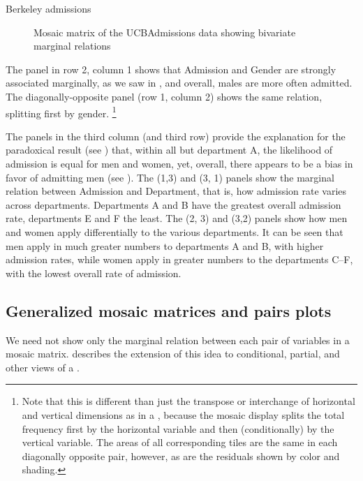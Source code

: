\documentclass[10pt,krantz2]{krantz}\usepackage[]{graphicx}\usepackage[]{color}
\newenvironment{knitrout}{}{} %
\renewenvironment{knitrout}{\small\renewcommand{\baselinestretch}{.85}}{} %
\begin{document}
\begin{Example}[berkeley4]{Berkeley admissions}
\begin{knitrout}
\begin{figure}[!htb]
\caption[Mosaic matrix of the UCBAdmissions data showing bivariate marginal relations]{Mosaic matrix of the UCBAdmissions data showing bivariate marginal relations\label{fig:berk-pairs1}}
\end{figure}


\end{knitrout}
The panel in row 2, column 1
shows that Admission and Gender are
strongly associated marginally, as we saw in ,
and overall, males are more often admitted.
The diagonally-opposite panel (row 1, column 2) shows the
same relation, splitting first by gender.%
\footnote{Note that this is different than just the transpose or interchange
of horizontal and vertical dimensions as in a \scatmat,
because the mosaic display splits the total frequency first by the horizontal
variable and then (conditionally) by the vertical variable.
The areas of all corresponding tiles are the same in each diagonally
opposite pair, however, as are the
residuals shown by color and shading.}

The panels in the third column (and third row)
provide the explanation for the paradoxical
result (see ) that, within all but department A,
the likelihood of admission is equal for men and women,
yet, overall, there appears to be a bias in favor of admitting men
(see ).
The (1,3) and (3, 1) panels show
the marginal relation between Admission and Department, that is,
how admission rate varies across departments.
Departments A and B have the greatest
overall admission rate, departments E and F the least.
The (2, 3) and (3,2)
panels show how men and women apply differentially to
the various departments.
It can be seen that
men apply in much greater numbers to
departments A and B, with higher admission rates,
while women apply in greater numbers to
the departments C--F, with the lowest overall rate of admission.

\end{Example}

\subsection{Generalized mosaic matrices and pairs plots}\label{sec:condmat}

We need not show only the marginal relation between
each pair of variables in a mosaic matrix.
\citep{Friendly:99:EMD} describes the extension of this idea
to conditional, partial, and other views of a \ctab.
\end{document}
